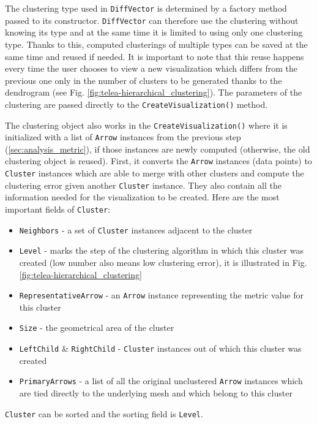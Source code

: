 The clustering type used in \verb+DiffVector+ is determined by a factory method passed to its constructor. \verb+DiffVector+ can therefore use the clustering without knowing its type and at the same time it is limited to using only one clustering type. Thanks to this, computed clusterings of multiple types can be saved at the same time and reused if needed. It is important to note that this reuse happens every time the user chooses to view a new visualization which differs from the previous one only in the number of clusters to be generated thanks to the dendrogram (see Fig. \ref{fig:telea-hierarchical_clustering}). The parameters of the clustering are passed directly to the \verb+CreateVisualization()+ method.

The clustering object also works in the \verb+CreateVisualization()+ where it is initialized with a list of \verb+Arrow+ instances from the previous step (\ref{sec:analysis_metric}), if those instances are newly computed (otherwise, the old clustering object is reused). First, it converts the \verb+Arrow+ instances (data points) to \verb+Cluster+ instances which are able to merge with other clusters and compute the clustering error given another \verb+Cluster+ instance. They also contain all the information needed for the visualization to be created. Here are the most important fields of \verb+Cluster+:

\begin{itemize}
\item \verb+Neighbors+ - a set of \verb+Cluster+ instances adjacent to the cluster
\item \verb+Level+ - marks the step of the clustering algorithm in which this cluster was created (low number also means low clustering error), it is illustrated in Fig. \ref{fig:telea-hierarchical_clustering}
\item \verb+RepresentativeArrow+ - an \verb+Arrow+ instance representing the metric value for this cluster
\item \verb+Size+ - the geometrical area of the cluster
\item \verb+LeftChild+ \& \verb+RightChild+ - \verb+Cluster+ instances out of which this cluster was created
\item \verb+PrimaryArrows+ - a list of all the original unclustered \verb+Arrow+ instances which are tied directly to the underlying mesh and which belong to this cluster
\end{itemize}

\verb+Cluster+ can be sorted and the sorting field is \verb+Level+.

